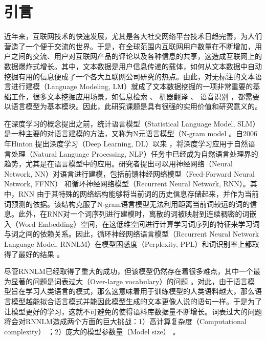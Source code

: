 \documentclass[12pt,a4paper]{article}
\begin{document}
\section{引言}
\label{sec:intro}
近年来，互联网技术的快速发展，尤其是各大社交网络平台技术日趋完善，为人们营造了一个便于交流的世界。于是，在全球范围内互联网用户数量在不断增加，用户之间的交流、用户对互联网产品的评论以及各种信息的共享，这造成互联网上的数据爆炸式增长。其中，文本数据是用户信息传递的载体，如何从文本数据中自动挖掘有用的信息便成了一个各大互联网公司研究的热点。由此，对无标注的文本语言进行建模（Language Modeling, LM）就成了文本数据挖掘的一项非常重要的基础工作，很多文本挖掘应用场景，如信息检索 \cite{Jin:2002:TLM:564376.564386}、 机器翻译 \cite{DBLP:conf/naacl/BaltescuB15}、 语音识别 \cite{DBLP:conf/interspeech/SakSB14}，都需要以语言模型为基本模块。因此，此研究课题是具有很强的实用价值和研究意义的。

在深度学习的概念提出之前，统计语言模型（Statistical Language Model, SLM） 是一种主要的对语言建模的方法，又称为N元语言模型（N-gram model \cite{DBLP:journals/csl/ChenG99}。自2006 年Hinton 提出深度学习（Deep Learning, DL）以来 \cite{hinton2006reducing}，将深度学习应用于自然语言处理（Natural Language Processing, NLP）任务中已经成为自然语言处理界的趋势，尤其是在语言模型中的应用。研究者提出可以用神经网络（Neural Network, NN）对语言进行建模，包括前馈神经网络模型（Feed-Forward Neural Network, FFNN）\cite{DBLP:conf/nips/BengioDV00} 和循环神经网络模型（Recurrent Neural Network, RNN）\cite{DBLP:conf/interspeech/MikolovKBCK10}。其中，RNN 由于其特殊的网络结构能够将当前词的历史信息存储起来，并作为当前词预测的依据。该结构克服了N-gram语言模型无法利用距离当前词较远的词的信息。此外，在RNN对一个词序列进行建模时，离散的词被映射到连续稠密的词嵌入（Word Embedding）空间，在这低维空间进行计算学习词序列的特征来学习词与词之间的依赖关系。因此，循环神经网络语言模型（Recurrent Neural Network Language Model, RNNLM）在模型困惑度（Perplexity, PPL）和词识别率上都取得了最好的结果 \cite{DBLP:conf/icassp/MikolovKBCK11}。

尽管RNNLM已经取得了重大的成功，但该模型仍然存在着很多难点，其中一个最为显著的问题是词表过大（Over-large vocabulary）的问题 \cite{DBLP:conf/interspeech/ChenWLGW14}。对此，由于语言模型旨在学习人类语言的模式，那么这意味着用于训练模型的人类语料越大，那么语言模型越能拟合语言模式并能因此模型生成的文本更像人说的语句一样。于是为了让模型更好的学习，这就不可避免的使得语料库数据量不断增长。词表过大的问题将会对RNNLM造成两个方面的巨大挑战：1）高计算复杂度（Computational complexity） \cite{DBLP:conf/acl/ChenGA16}；2）庞大的模型参数量（Model size） \cite{DBLP:conf/nips/LiQYHL16}。
\end{document}
